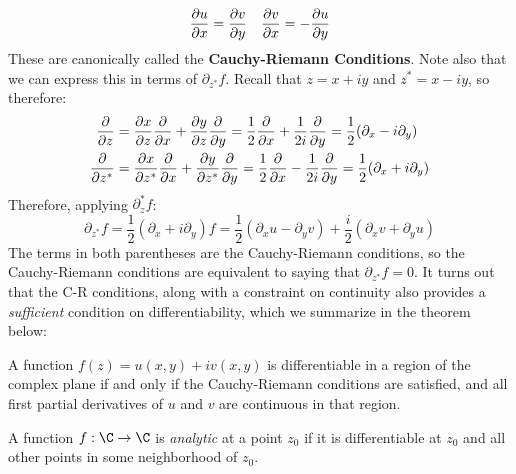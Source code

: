 \[
	\pdv{u}{x} = \pdv{v}{y} \quad \pdv{v}{x} = -\pdv{u}{y}
\]
These are canonically called the \textbf{Cauchy-Riemann Conditions}. Note also that we can express this in
terms of \( \partial_{z^{*}}f \). Recall that \( z = x + iy \) and \( z^{*} = x - iy \), so therefore:
\begin{align*}
	\pdv{z} &= \pdv{x}{z} \pdv{x} + \pdv{y}{z} \pdv{y} = \frac{1}{2}\pdv{x} + \frac{1}{2i}\pdv{y} =
	\frac{1}{2}(\partial_x - i \partial_y)\\
	\pdv{z^{*}} &= \pdv{x}{z^{*}} \pdv{x} + \pdv{y}{z^{*}} \pdv{y} = \frac{1}{2}\pdv{x} - \frac{1}{2i}\pdv{y}
	= \frac{1}{2}(\partial_x + i \partial_y) 
\end{align*}
Therefore, applying \( \partial_z^{*} f \):
\[
	\partial_{z^{*}}f = \frac{1}{2}\left( \partial_x + i \partial_y \right)f = \frac{1}{2}(\partial_x u -
	\partial_y v) + \frac{i}{2}\left( \partial_x v + \partial_y u \right) 
\]
The terms in both parentheses are the Cauchy-Riemann conditions, so the Cauchy-Riemann conditions are
equivalent to saying that \( \partial_{z^{*}}f = 0 \). It turns out that the C-R conditions, along with a
constraint on continuity also provides a \textit{sufficient} condition on differentiability, which we
summarize in the theorem below:
\begin{theorem}[Differentiability]
	A function \( f(z) = u(x, y) + i v(x, y) \) is differentiable in a region of the complex plane if and
	only if the Cauchy-Riemann conditions are satisfied, and all first partial derivatives of \( u \) and \(
	v \) are continuous in that region. 	
\end{theorem}
\begin{definition}[Analyticity] 
	A function \( f: \C \to \C \) is \textit{analytic} at a point \( z_0 \) if it is differentiable at \( z_0
	\) and all other points in some neighborhood of \( z_0 \). 
\end{definition}
